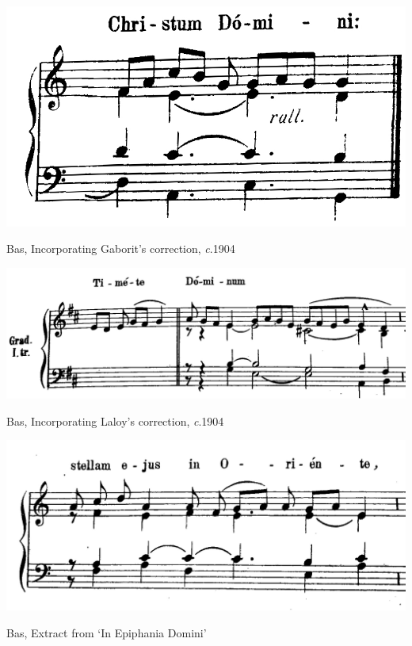 \vspace*{\fill}

\newpage

\vspace*{\fill}

\begin{example}
  \centering
  \includegraphics[width=.5\linewidth]{c/4/ex/bas_gaborit.jpg}
  \caption{Bas, Incorporating Gaborit's correction, \emph{c}.1904}
  \label{mus:bas_gaborit}
\end{example}

\vspace*{\fill}

\begin{example}
  \centering
  \includegraphics[width=.8\linewidth]{c/4/ex/bas_laloy.jpg}
  \caption{Bas, Incorporating Laloy's correction, \emph{c}.1904}
  \label{mus:bas_laloy}
\end{example}

\vspace*{\fill}

\begin{example}
  \centering
  \includegraphics[width=.7\linewidth]{c/4/ex/bas_bewerungecritic.jpg}
  \caption{Bas, Extract from `In Epiphania Domini'}
  \label{mus:bas_bewerungecritic}
\end{example}

\vspace*{\fill}

